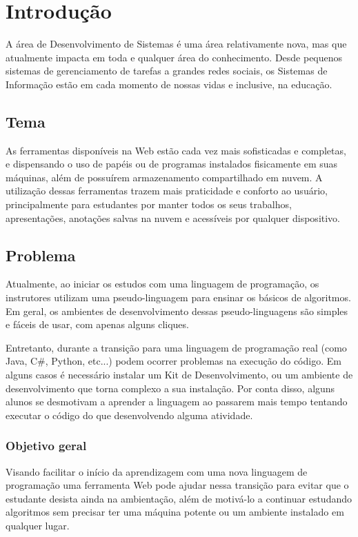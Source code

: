 \chapter{Introdução}
\label{chp:introducao}
A área de Desenvolvimento de Sistemas é uma área relativamente nova, mas que atualmente impacta em toda e qualquer área do conhecimento. Desde pequenos sistemas de gerenciamento de tarefas a grandes redes sociais, os Sistemas de Informação estão em cada momento de nossas vidas e inclusive, na educação.

\section{Tema}
\label{sec:tema}
As ferramentas disponíveis na Web estão cada vez mais sofisticadas e completas, e dispensando o uso de papéis ou de programas instalados fisicamente em suas máquinas, além de possuírem armazenamento compartilhado em nuvem. A utilização dessas ferramentas trazem mais praticidade e conforto ao usuário, principalmente para estudantes por manter todos os seus trabalhos, apresentações, anotações salvas na nuvem e acessíveis por qualquer dispositivo.

\section{Problema}
\label{sec:problema}
Atualmente, ao iniciar os estudos com uma linguagem de programação, os instrutores utilizam uma pseudo-linguagem para ensinar os básicos de algoritmos.
Em geral, os ambientes de desenvolvimento dessas pseudo-linguagens são simples e fáceis de usar, com apenas alguns cliques.

Entretanto, durante a transição para uma linguagem de programação real (como Java, C\#, Python, etc...) podem ocorrer problemas na execução do código. Em alguns casos é necessário instalar um Kit de Desenvolvimento, ou um ambiente de desenvolvimento que torna complexo a sua instalação. Por conta disso, alguns alunos se desmotivam a aprender a linguagem ao passarem mais tempo tentando executar o código do que desenvolvendo alguma atividade.

\subsection{Objetivo geral}
\label{subsec:objetivo-geral}
Visando facilitar o início da aprendizagem com uma nova linguagem de programação uma ferramenta Web pode ajudar nessa transição para evitar que o estudante desista ainda na ambientação, além de motivá-lo a continuar estudando algoritmos sem precisar ter uma máquina potente ou um ambiente instalado em qualquer lugar.

